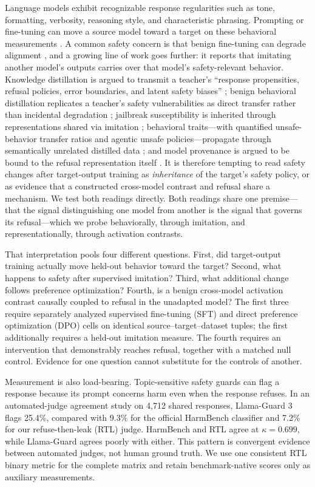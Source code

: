 \documentclass[letterpaper]{article}
\begin{document}
Language models exhibit recognizable response regularities such as tone, formatting, verbosity, reasoning style, and characteristic phrasing. Prompting or fine-tuning can move a source model toward a target on these behavioral measurements \citep{hinton2015,gudibande2023}. A common safety concern is that benign fine-tuning can degrade alignment \citep{qi2023}, and a growing line of work goes further: it reports that imitating another model's outputs carries over that model's safety-relevant
behavior. Knowledge distillation is argued to transmit a teacher's ``response propensities,
refusal policies, error boundaries, and latent safety biases'' \citep{du2026rgflow}; benign behavioral
distillation replicates a teacher's safety vulnerabilities as direct transfer rather than
incidental degradation \citep{jahan2025medical}; jailbreak susceptibility is inherited
through representations shared via imitation \citep{angell2025jailbreak}; behavioral traits---with
quantified unsafe-behavior transfer ratios and agentic unsafe policies---propagate through
semantically unrelated distilled data \citep{cloud2025subliminal,koenig2026ratio,dang2026agent}; and
model provenance is argued to be bound to the refusal representation itself
\citep{xu2026fingerprint}. It is therefore tempting to read safety changes after
target-output training as \emph{inheritance} of the target's safety policy, or as evidence
that a constructed cross-model contrast and refusal share a mechanism. We test both readings
directly. Both readings share one premise---that the signal distinguishing one model from another is
the signal that governs its refusal---which we probe behaviorally, through imitation, and
representationally, through activation contrasts.

That interpretation pools four different questions. First, did target-output training
actually move held-out behavior toward the target? Second, what happens to safety after
supervised imitation? Third, what additional change follows preference optimization?
Fourth, is a benign cross-model activation contrast causally coupled to
refusal in the unadapted model? The first three require separately analyzed supervised
fine-tuning (SFT) and direct preference optimization (DPO) cells on identical
source--target--dataset tuples; the first additionally requires a
held-out imitation measure. The fourth requires an intervention
that demonstrably reaches refusal, together with a matched null control. Evidence for
one question cannot substitute for the controls of another.

Measurement is also load-bearing. Topic-sensitive safety guards can flag a response
because its prompt concerns harm even when the response refuses. In an automated-judge
agreement study on 4,712 shared responses, Llama-Guard 3 flags 25.4\%, compared with
9.3\% for the official HarmBench classifier and 7.2\% for our refuse-then-leak (RTL)
judge. HarmBench and RTL agree at $\kappa=0.699$, while Llama-Guard agrees poorly with
either. This pattern is convergent evidence between automated judges, not human ground truth.
We use one consistent RTL binary metric for the complete matrix and retain
benchmark-native scores only as auxiliary measurements.
\end{document}

